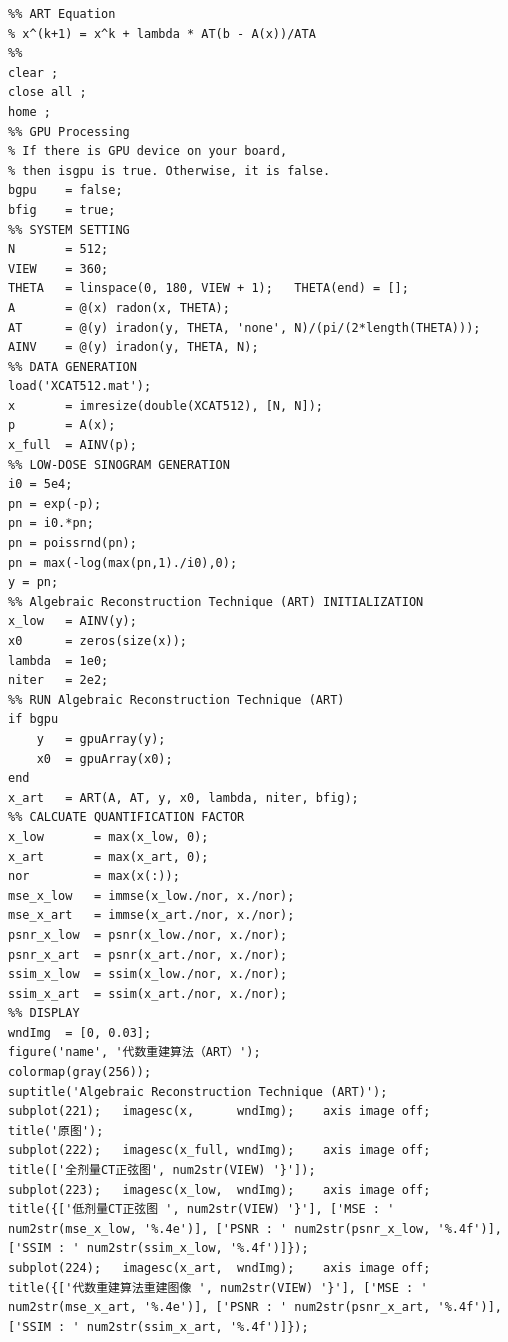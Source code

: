 \documentclass[hyperref]{ctexart}
\begin{document}
\begin{appendices}
\begin{lstlisting}
%% ART Equation
% x^(k+1) = x^k + lambda * AT(b - A(x))/ATA 
%%
clear ;
close all ;
home ;
%% GPU Processing
% If there is GPU device on your board, 
% then isgpu is true. Otherwise, it is false.
bgpu    = false;
bfig    = true;
%% SYSTEM SETTING
N       = 512;
VIEW    = 360;
THETA   = linspace(0, 180, VIEW + 1);   THETA(end) = [];
A       = @(x) radon(x, THETA);
AT      = @(y) iradon(y, THETA, 'none', N)/(pi/(2*length(THETA)));
AINV    = @(y) iradon(y, THETA, N);
%% DATA GENERATION
load('XCAT512.mat');
x       = imresize(double(XCAT512), [N, N]);
p       = A(x);
x_full  = AINV(p);
%% LOW-DOSE SINOGRAM GENERATION
i0 = 5e4;
pn = exp(-p);
pn = i0.*pn;
pn = poissrnd(pn);
pn = max(-log(max(pn,1)./i0),0);
y = pn;
%% Algebraic Reconstruction Technique (ART) INITIALIZATION
x_low   = AINV(y);
x0      = zeros(size(x));
lambda  = 1e0;
niter   = 2e2;
%% RUN Algebraic Reconstruction Technique (ART)
if bgpu
    y   = gpuArray(y);
    x0  = gpuArray(x0);
end
x_art   = ART(A, AT, y, x0, lambda, niter, bfig);
%% CALCUATE QUANTIFICATION FACTOR 
x_low       = max(x_low, 0);
x_art       = max(x_art, 0);
nor         = max(x(:));
mse_x_low   = immse(x_low./nor, x./nor);
mse_x_art   = immse(x_art./nor, x./nor);
psnr_x_low 	= psnr(x_low./nor, x./nor);
psnr_x_art 	= psnr(x_art./nor, x./nor);
ssim_x_low  = ssim(x_low./nor, x./nor);
ssim_x_art  = ssim(x_art./nor, x./nor);
%% DISPLAY
wndImg  = [0, 0.03];
figure('name', '代数重建算法（ART）');
colormap(gray(256));
suptitle('Algebraic Reconstruction Technique (ART)');
subplot(221);   imagesc(x,     	wndImg); 	axis image off;     title('原图');
subplot(222);   imagesc(x_full, wndImg);   	axis image off;     title(['全剂量CT正弦图', num2str(VIEW) '}']);
subplot(223);   imagesc(x_low,  wndImg);   	axis image off;     title({['低剂量CT正弦图 ', num2str(VIEW) '}'], ['MSE : ' num2str(mse_x_low, '%.4e')], ['PSNR : ' num2str(psnr_x_low, '%.4f')], ['SSIM : ' num2str(ssim_x_low, '%.4f')]});
subplot(224);   imagesc(x_art,  wndImg);  	axis image off;     title({['代数重建算法重建图像 ', num2str(VIEW) '}'], ['MSE : ' num2str(mse_x_art, '%.4e')], ['PSNR : ' num2str(psnr_x_art, '%.4f')], ['SSIM : ' num2str(ssim_x_art, '%.4f')]});
		\end{lstlisting}

	\end{appendices}
\end{document}
